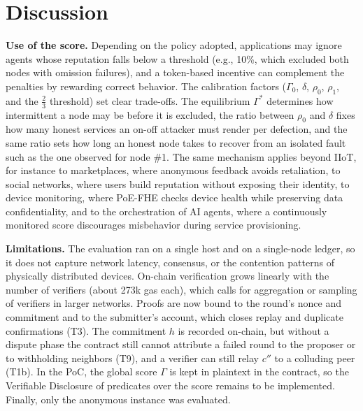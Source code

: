 \documentclass[conference]{IEEEtran}
\begin{document}
\section{Discussion}\label{sec:discussion}
\textbf{Use of the score.} Depending on the policy adopted, applications may ignore agents whose reputation falls below a threshold (e.g., 10\%, which excluded both nodes with omission failures), and a token-based incentive can complement the penalties by rewarding correct behavior. The calibration factors ($\Gamma_0$, $\delta$, $\rho_0$, $\rho_1$, and the $\frac{2}{3}$ threshold) set clear trade-offs. The equilibrium $\Gamma^{*}$ determines how intermittent a node may be before it is excluded, the ratio between $\rho_0$ and $\delta$ fixes how many honest services an on-off attacker must render per defection, and the same ratio sets how long an honest node takes to recover from an isolated fault such as the one observed for node \#1. The same mechanism applies beyond IIoT, for instance to marketplaces, where anonymous feedback avoids retaliation, to social networks, where users build reputation without exposing their identity, to device monitoring, where PoE-FHE checks device health while preserving data confidentiality, and to the orchestration of AI agents, where a continuously monitored score discourages misbehavior during service provisioning.

\textbf{Limitations.} The evaluation ran on a single host and on a single-node ledger, so it does not capture network latency, consensus, or the contention patterns of physically distributed devices. On-chain verification grows linearly with the number of verifiers (about 273k gas each), which calls for aggregation or sampling of verifiers in larger networks. Proofs are now bound to the round's nonce and commitment and to the submitter's account, which closes replay and duplicate confirmations (T3). The commitment $h$ is recorded on-chain, but without a dispute phase the contract still cannot attribute a failed round to the proposer or to withholding neighbors (T9), and a verifier can still relay $c''$ to a colluding peer (T1b). In the PoC, the global score $\Gamma$ is kept in plaintext in the contract, so the Verifiable Disclosure of predicates over the score remains to be implemented. Finally, only the anonymous instance was evaluated.
\end{document}
